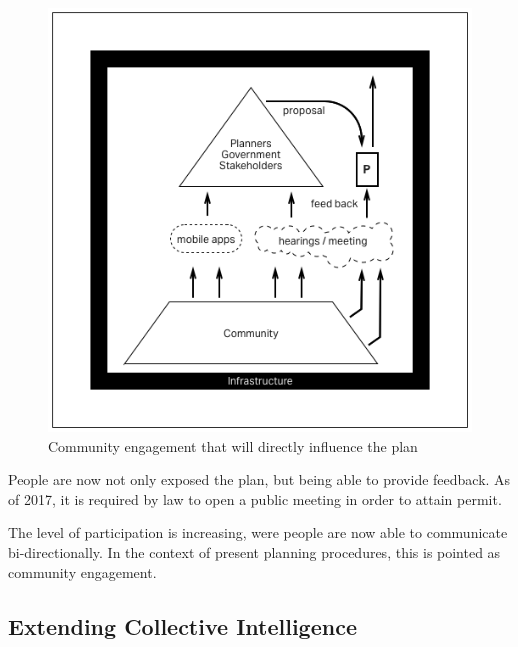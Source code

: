 \begin{figure}[htb]
  \includegraphics[width=\textwidth]{chapters/2/fig/community_engagment.png}               
  \caption[diagram: community engagment]{Community engagement that will directly influence the plan}
  \label{fig:externalized_plan}
\end{figure}

People are now not only exposed the plan, but being able to provide
feedback. As of 2017, it is required by law to open a public meeting in
order to attain permit.

The level of participation is increasing, were people are now able to
communicate bi-directionally.
In the context of present planning procedures, this is pointed as community engagement.

\subsection{Extending Collective Intelligence}

